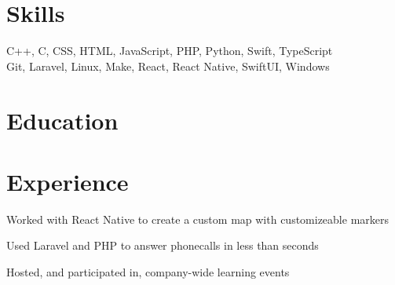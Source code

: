 \documentclass[]{deedy-resume-openfont}
\begin{document}
\hfill
\begin{minipage}[t]{0.95\textwidth}


\section{Skills}
C++, C, CSS, HTML, JavaScript, PHP, Python, Swift, TypeScript\\
Git, Laravel, Linux, Make, React, React Native, SwiftUI, Windows


\section{Education} 






\section{Experience}



\vspace{\topsep} %
\begin{tightemize}
\item Worked with React Native to create a custom map with customizeable markers
\item Used Laravel and PHP to answer phonecalls in less than seconds
\item Hosted, and participated in, company-wide learning events
\end{tightemize}


\end{minipage}
\end{document}
